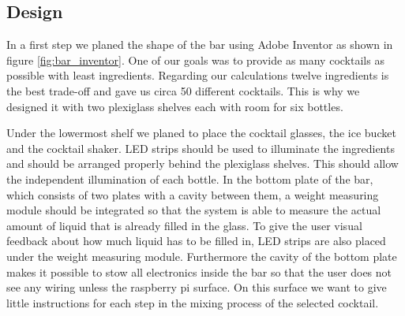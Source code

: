 \documentclass{acm_proc_article-sp}
\begin{document}
\subsection{Design}

In a first step we planed the shape of the bar using Adobe Inventor as shown in figure \ref{fig:bar_inventor}. One of our goals was to provide as many cocktails as possible with least ingredients. Regarding our calculations twelve ingredients is the best trade-off and gave us circa 50 different cocktails. This is why we designed it with two plexiglass shelves each with room for six bottles.

\begin{minipage}{\linewidth}%
\label{fig:bar_inventor}%
\end{minipage}

Under the lowermost shelf we planed to place the cocktail glasses, the ice bucket and the cocktail shaker. LED strips should be used to illuminate the ingredients and should be arranged properly behind the plexiglass shelves. This should allow the independent illumination of each bottle. In the bottom plate of the bar, which consists of two plates with a cavity between them, a weight measuring module should be integrated so that the system is able to measure the actual amount of liquid that is already filled in the glass. To give the user visual feedback about how much liquid has to be filled in, LED strips are also placed under the weight measuring module. Furthermore the cavity of the bottom plate makes it possible to stow all electronics inside the bar so that the user does not see any wiring unless the raspberry pi surface. On this surface we want to give little instructions for each step in the mixing process of the selected cocktail.
\end{document}
